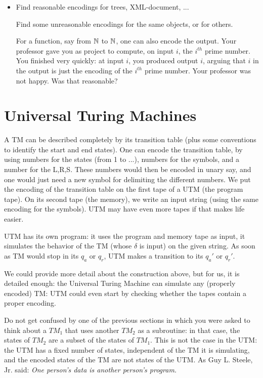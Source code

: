 \begin{itemize}
\item[]
Find reasonable encodings for trees, XML-document, ...

Find some unreasonable encodings for the same objects, or for others.

For a function, say from $\mathbb{N}$ to $\mathbb{N}$, one can also encode the
output. Your professor gave you as project to compute, on input $i$, the
$i^{th}$ prime number. You finished very quickly: at input $i$, you
produced output $i$, arguing that $i$ in the output is just the
encoding of the $i^{th}$ prime number. Your professor was not
happy. Was that reasonable?

\end{itemize}



\section{Universal Turing Machines}

A TM can be described completely by its transition table (plus some
conventions to identify the start and end states). One can encode the
transition table, by using numbers for the states (from 1 to ...),
numbers for the symbols, and a number for the L,R,S. These numbers
would then be encoded in unary say, and one would just need a new
symbol for delimiting the different numbers. We put the encoding of 
the transition table on the first tape of a UTM (the program tape). On
its second tape (the memory), we write an input string (using the same
encoding for the symbols).  UTM may have even more tapes if that makes
life easier.

UTM has its own program: it uses the program and memory tape as input,
it simulates the behavior of the TM (whose $\delta$ is input) on the
given string. As soon as TM would stop in its $q_a$ or $q_r$, UTM
makes a transition to its $q_a'$ or $q_r'$.

We could provide more detail about the construction above, but for us,
it is detailed enough: the Universal Turing Machine can simulate any
(properly encoded) TM: UTM could even start by checking whether the
tapes contain a proper encoding.

Do not get confused by one of the previous sections in which you were
asked to think about a $TM_1$ that uses another $TM_2$ as a
subroutine: in that case, the states of $TM_2$ are a subset of the
states of $TM_1$. This is not the case in the UTM: the UTM has a fixed
number of states, independent of the TM it is simulating, and the
encoded states of the TM are not states of the UTM. As Guy L. Steele,
Jr. said: {\em One person's data is another person's program.}


